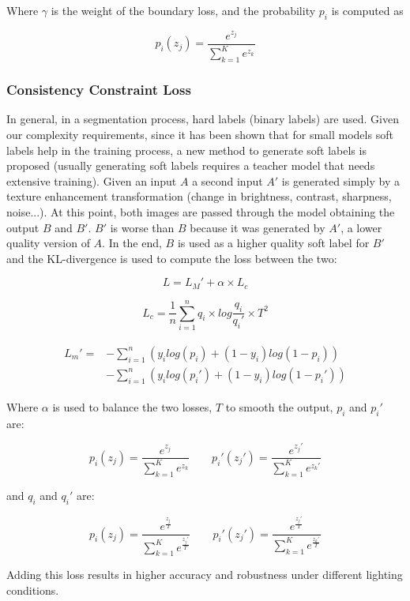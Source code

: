 Where $\gamma$ is the weight of the boundary loss, and the probability $p_i$ is computed as 

\begin{equation}
    p_i(z_j)=\frac{e^{z_j}}{\sum_{k=1}^Ke^{z_k}}
\end{equation}


\subsubsection{Consistency Constraint Loss}
In general, in a segmentation process, hard labels (binary labels) are used. Given our complexity requirements, since it has been shown that for small models soft labels help in the training process, a new method to generate soft labels is proposed (usually generating soft labels requires a teacher model that needs extensive training). 
Given an input $A$ a second input $A'$ is generated simply by a texture enhancement transformation (change in brightness, contrast, sharpness, noise...).
At this point, both images are passed through the model obtaining the output $B$ and $B'$. $B'$ is worse than $B$ because it was generated by $A'$, a lower quality version of $A$. In the end, $B$ is used as a higher quality soft label for $B'$ and the KL-divergence is used to compute the loss between the two:

\begin{equation}
    L=L_M'+\alpha\times L_c 
\end{equation}

\begin{equation}
    L_c = \frac{1}{n}\sum_{i=1}^n q_i \times log\frac{q_i}{q_i'} \times T^2
\end{equation}

\begin{align}
\begin{split}
    L_m' = &- \sum_{i=1}^{n}(y_ilog(p_i)+(1-y_i)log(1-p_i)) \\ 
    &- \sum_{i=1}^{n}(y_ilog(p_i')+(1-y_i)log(1-p_i'))
\end{split}
\end{align}

Where $\alpha$ is used to balance the two losses, $T$ to smooth the output, $p_i$ and $p_i'$ are:

\begin{equation}
    p_i(z_j)=\frac{e^{z_j}}{\sum_{k=1}^Ke^{z_k}}
    \qquad
    p_i'(z_j')=\frac{e^{z_j'}}{\sum_{k=1}^Ke^{z_k'}}
\end{equation}

and $q_i$ and $q_i'$ are:

\begin{equation}
    p_i(z_j)=\frac{e^{\frac{z_j}{T}}}{\sum_{k=1}^Ke^{\frac{z_j'}{T}}}
    \qquad
    p_i'(z_j')=\frac{e^{\frac{z_j'}{T}}}{\sum_{k=1}^Ke^{\frac{z_k'}{T}}}
\end{equation}

Adding this loss results in higher accuracy and robustness under different lighting conditions.